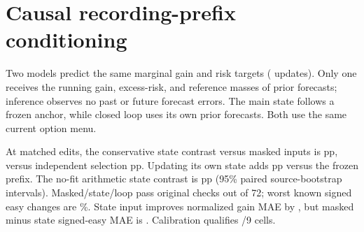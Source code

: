 \section{Causal recording-prefix conditioning}
Two models predict the same marginal gain and risk targets
(\PrefixStateUpdates{} updates). Only one receives the running
gain, excess-risk, and reference masses of prior forecasts;
inference observes no past or future forecast errors. The main
state follows a frozen anchor, while closed loop uses its own
prior forecasts. Both use the same current option menu.

At \PrefixStateEdits{} matched edits, the conservative state
contrast versus masked inputs is \PrefixStateState{} pp, versus
independent selection \PrefixStateIndependent{} pp. Updating
its own state adds \PrefixStateLoop{} pp versus the frozen prefix.
The no-fit arithmetic state contrast is \PrefixStateArithmetic{} pp
(95\% paired source-bootstrap intervals). Masked/state/loop
pass \PrefixStatePasses{} original checks out of 72; worst known
signed easy changes are \PrefixStateWorst{}\%.
State input improves normalized gain MAE by \PrefixStateGain{},
but masked minus state signed-easy MAE is \PrefixStateEasy{}.
Calibration qualifies \PrefixStateQual{}/9 cells.
